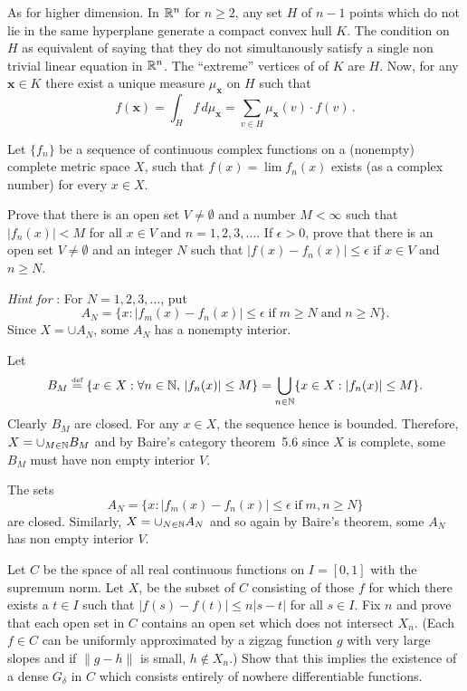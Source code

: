 \begin{enumerate}
As for higher dimension. In \(\mathbb{R}^n\) for \(n\geq 2\),
any  set $H$ of \(n-1\) points which do not lie in the same hyperplane
generate a compact convex hull $K$.
The condition on $H$ as equivalent of saying that they do not 
simultanously satisfy a single non trivial linear equation in \(\mathbb{R}^n\).
The ``extreme'' vertices of of $K$ are $H$.
Now, for any \(\mathbf{x}\in K\) there exist a unique measure 
\(\mu_{\mathbf{x}}\) on $H$ such that
\[f(\mathbf{x}) 
  = \int_H f\,d\mu_{\mathbf{x}} 
  = \sum_{v\in H} \mu_{\mathbf{x}}(v) \cdot f(v)\,.\]

\begin{excopy}
Let \(\{f_n\}\) be a sequence of continuous complex functions on a (nonempty)
complete metric space $X$, such that \(f(x) = \lim f_n(x)\) exists
(as a complex number) for every \(x\in X\).
\begin{itemize}
  Prove that there is an open set \(V\neq \emptyset\) and a number
            \(M<\infty\) such that \(|f_n(x)| < M\) for all \(x\in V\)
            and \(n=1,2,3,\ldots\).
  If \(\epsilon>0\), prove that there is an open set \(V\neq\emptyset\)
            and an integer $N$ such that \(|f(x) - f_n(x)| \leq \epsilon\)
            if \(x\in V\) and \(n\geq N\).

\end{itemize}
\emph{Hint for }: For \(N=1,2,3,\ldots\), put
\[ A_N = \{x: |f_m(x)-f_n(x)|\leq \epsilon
\;\textrm{if}\; m\geq N\;\textrm{and}\; n\geq N\}.\]
Since \(X=\cup A_N\), some \(A_N\) has a nonempty interior.
\end{excopy}


\begin{itemize}
Let 
\[ B_M \stackrel{\mbox{\upshape\tiny def}}{=}  \{x\in X: \forall n\in\mathbb{N},\, |f_n(x)|\leq M\} 
  = \bigcup_{n\in\mathbb{N}} \{x\in X: |f_n(x)|\leq M\}.\]
Clearly \(B_M\) are closed. For any \(x\in X\), 
the sequence  hence  is bounded.
Therefore, \(X=\cup_{M\in\mathbb{N}} B_M\) and
by Baire's category theorem~5.6 since $X$ is complete, some \(B_M\) 
must have non empty interior $V$.

The sets 
\[ A_N = \{x: |f_m(x)-f_n(x)|\leq \epsilon\;\textrm{if}\; m,n\geq N\}\]
are closed. Similarly, \(X=\cup_{N\in\mathbb{N}} A_N\)
and so again by Baire's theorem, some \(A_N\) has non empty interior $V$.
\end{itemize}

\begin{excopy}
Let $C$ be the space of all real continuous functions on \(I=[0,1]\)
with the supremum norm. Let $X$, be the subset of $C$ consisting of those
$f$ for which there exists a \(t\in I\) such that \(|f(s)-f(t)| \leq n|s-t|\)
for all \(s\in I\). Fix $n$ and prove that each open set in $C$ contains
an open set which does not intersect \(X_n\). (Each \(f\in C\) can be uniformly
approximated by a zigzag function $g$ with very large slopes and if
\(\|g-h\|\) is small, \(h\notin X_n\).)
Show that this implies the existence of a dense \(G_\delta\) in $C$ which
consists entirely of nowhere differentiable functions.
\end{excopy}



\end{enumerate}
